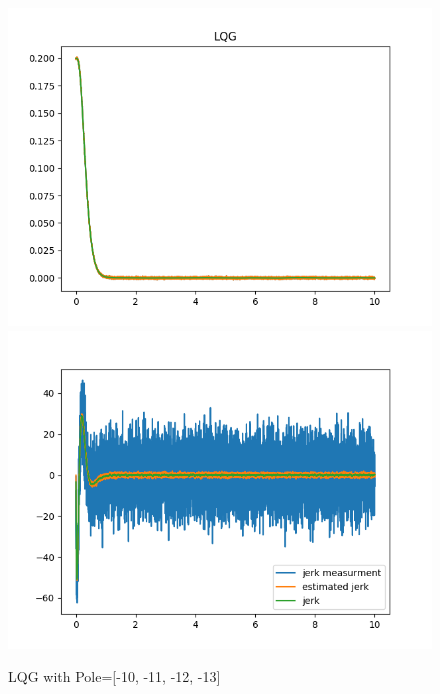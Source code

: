 \documentclass[12pt]{article}
\begin{document}
\begin{figure}[!h]
\centering
\includegraphics[scale=1]{fig/LQG_regulation.png} 
\includegraphics[scale=1]{fig/LQG_jerk_estimation.png}
\caption{LQG with Pole=[-10, -11, -12, -13]}
\label{Tux}
\end{figure}
\end{document}
